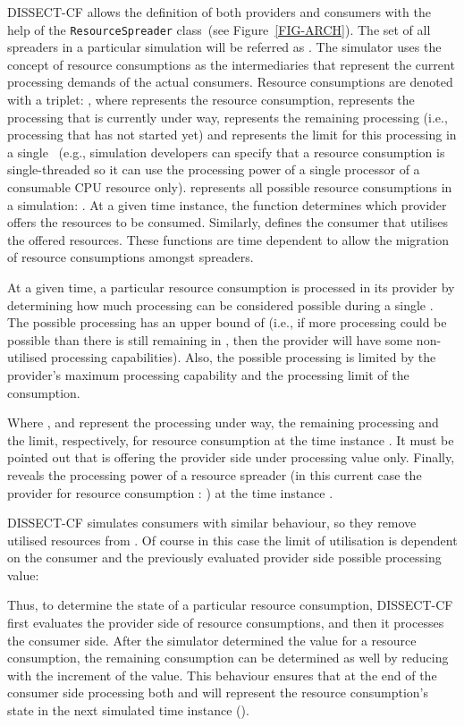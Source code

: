 \documentclass[sort, compress, 5p]{elsarticle}
\newcommand{\SMALLESTIMEGRANULARITY}{}
\begin{document}
DISSECT-CF allows the definition of both providers and consumers with the help of the \verb+ResourceSpreader+ class~(see Figure~\ref{FIG-ARCH}). The set of all spreaders in a particular simulation will be referred as . The simulator uses the concept of resource consumptions as the intermediaries that represent the current processing demands of the actual consumers. Resource consumptions are denoted with a triplet: , where  represents the resource consumption,  represents the processing that is currently under way,  represents the remaining processing (i.e., processing that has not started yet) and  represents the limit for this processing in a single \SMALLESTIMEGRANULARITY~(e.g., simulation developers can specify that a resource consumption is single-threaded so it can use the processing power of a single processor of a consumable CPU resource only).  represents all possible resource consumptions in a simulation: . At a given time instance, the function  determines which provider offers the resources to be consumed. Similarly,  defines the consumer that utilises the offered resources. These functions are time dependent to allow the migration of resource consumptions  amongst spreaders.

At a given time, a particular resource consumption is processed in its provider by determining how much processing can be considered possible during a single \SMALLESTIMEGRANULARITY. The possible processing has an upper bound of  (i.e., if more processing could be possible than there is still remaining in , then the provider will have some non-utilised processing capabilities). Also, the possible processing is limited by the provider's maximum processing capability and the processing limit  of the consumption.

Where ,  and  represent the processing under way, the remaining processing and the limit, respectively, for resource consumption  at the time instance . It must be pointed out that  is offering the provider side under processing value only. Finally,  reveals the processing power of a resource spreader (in this current case the provider for resource consumption : ) at the time instance . 

DISSECT-CF simulates consumers with similar behaviour, so they remove utilised resources from . Of course in this case the limit of utilisation is dependent on the consumer and the previously evaluated provider side possible processing value:

Thus, to determine the state of a particular resource consumption, DISSECT-CF first evaluates the provider side of resource consumptions, and then it processes the consumer side. After the simulator determined the  value for a resource consumption, the remaining consumption  can be determined as well by reducing with the increment of the  value. This behaviour ensures that at the end of the consumer side processing both  and  will represent the resource consumption's state in the next simulated time instance (). 
\end{document}
